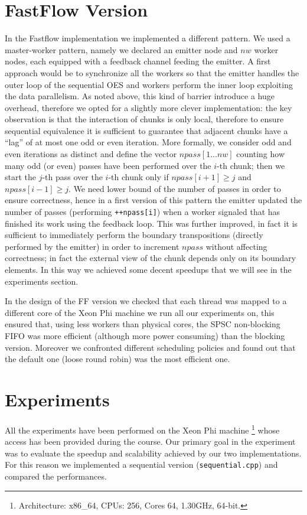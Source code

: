 \documentclass[12pt]{article}
\begin{document}
\section{FastFlow Version}
In the Fastflow implementation we implemented a different pattern. We
used a master-worker pattern, namely we declared an emitter node and
$nw$ worker nodes, each equipped with a feedback channel feeding the
emitter. A first approach would be to synchronize all the workers so
that the emitter handles the outer loop of the sequential OES and
workers perform the inner loop exploiting the data parallelism. As
noted above, this kind of barrier introduce a huge overhead, therefore
we opted for a slightly more clever implementation: the key
observation is that the interaction of chunks is only local, therefore
to ensure sequential equivalence it is sufficient to guarantee that
adjacent chunks have a ``lag'' of at most one odd or even iteration.
More formally, we
consider odd and even iterations as distinct and define the vector
$npass[1\dots nw]$ counting how many odd (or even) passes have been
performed over the $i$-th chunk; then we start the $j$-th pass over
the $i$-th chunk only if $npass[i + 1] \geq j$ and $npass[i - 1] \geq j$.
We need lower bound of the number of passes in order to ensure
correctness, hence in a first version of this pattern the emitter
updated the number of passes (performing
\texttt{++npass[i]}) when a worker signaled that has finished its work
using the feedback loop. This was further improved, in fact it is
sufficient to immediately perform the boundary transpositions
(directly performed by the emitter) in order to increment $npass$
without affecting correctness; in fact the external view of the chunk
depends only on its boundary elements. In this way we achieved some
decent speedups that we will see in the experiments section.

In the design of the FF version we checked that each thread was mapped
to a different core of the Xeon Phi machine we run all our experiments
on, this ensured that, using less workers than physical cores, the
SPSC non-blocking FIFO was more efficient (although more power
consuming) than the blocking version. Moreover we confronted different
scheduling policies and found out that the default one (loose round
robin) was the most efficient one.

\section{Experiments}
All the experiments have been performed on the Xeon Phi machine
\footnote{Architecture: x86\_64, CPUs: 256, Cores 64, 1.30GHz, 64-bit.} 
whose access has been provided during the course. Our primary goal in
the experiment was to evaluate the speedup and scalability achieved by
our two implementations. For this reason we implemented a sequential
version (\texttt{sequential.cpp}) and compared the performances.
\end{document}
